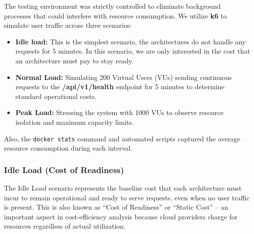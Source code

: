
 
The testing environment was strictly controlled to eliminate background 
processes that could interfere with resource consumption.
We utilize \textbf{k6} to simulate user traffic across three scenarios:

\begin{itemize}

    \item \textbf{Idle load:}  This is the simplest scenario, the architectures do not handle any requests for 5 minutes. 
    In this scenario, we are only interested in the cost that an architecture must pay to stay ready.

    \item \textbf{Normal Load:} Simulating 200 Virtual Users (VUs) sending continuous requests 
    to the \textbf{/api/v1/health} endpoint for 5 minutes to determine standard operational costs.

    \item \textbf{Peak Load:} Stressing the system with 1000 VUs to observe 
    resource isolation and maximum capacity limits.
\end{itemize}

Also, the \texttt{docker stats} command and automated scripts captured the 
average resource consumption during each interval.

\subsubsection{\textbf{Idle Load (Cost of Readiness)}}

The Idle Load scenario represents the baseline cost that each architecture must incur to remain operational and ready to serve requests, even when no user traffic is present. This is also known as ``Cost of Readiness'' or ``Static Cost'' -- an important aspect in cost-efficiency analysis because cloud providers charge for resources regardless of actual utilization.


